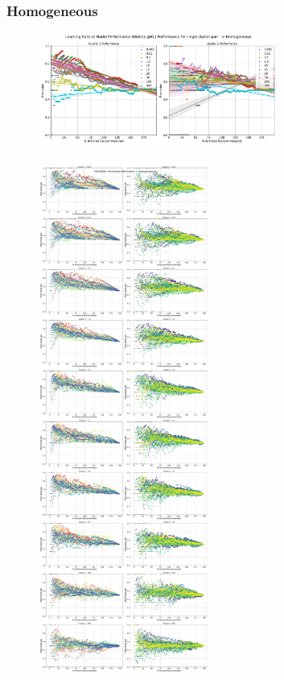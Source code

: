 \documentclass[a4paper,fontsize=8.0pt]{scrartcl}
\begin{document}
\subsubsection{Homogeneous}
\begin{figure}[H]
    \includegraphics[width=0.7\textwidth]{Graphs/TFIDF/lr_vs_model_performance_single_mixed_Homogeneous.pdf}
\end{figure}
\newpage
\begin{figure}[H]
    \includegraphics[width=0.5\textwidth]{Graphs/TFIDF/lr_vs_model_performance_precision_all_cps_mixed_data_sep_Homogeneous.pdf}
\end{figure}
\newpage
\end{document}

